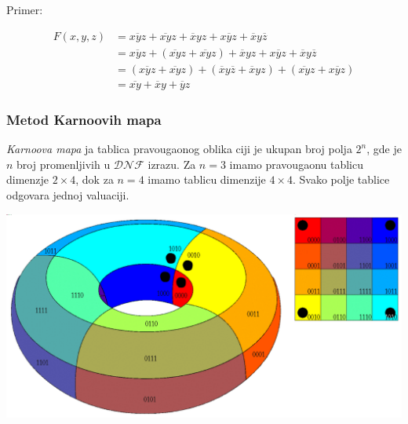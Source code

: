 \documentclass[12p,a4paper]{article}
\begin{document}
\begin{multicols}{2}
    Primer:

    \begin{align*}
        F(x, y, z) &=
        \overline{xyz} + \overline{xy}z + \overline{x}yz + 
        x\overline{y}z + \overline{x}y\overline{z} \\
        &= \overline{xyz} + (\overline{xy}z + \overline{xy}z) + 
        \overline{x}yz + x\overline{y}z + \overline{x}y\overline{z} \\
        &= (\overline{xyz} + \overline{xy}z) + 
        (\overline{x}y\overline{z} + \overline{x}yz) + 
        (\overline{xy}z +  x\overline{y}z) \\
        &= \overline{xy} + \overline{x}y + \overline{y}z
    \end{align*}

    \subsubsection{Metod Karnoovih mapa}

    \emph{Karnoova mapa} ja tablica pravougaonog oblika ciji je ukupan broj 
    polja $2^n$, gde je $n$ broj promenljivih u $\mathcal{DNF}$ izrazu.
    Za $n = 3$ imamo pravougaonu tablicu dimenzje $2 \times 4$, dok za $n = 4$
    imamo tablicu dimenzije $4 \times 4$. Svako polje tablice odgovara jednoj 
    valuaciji.

    \includegraphics[width=\columnwidth]{Figures/torus.png}


\end{multicols}
\end{document}
